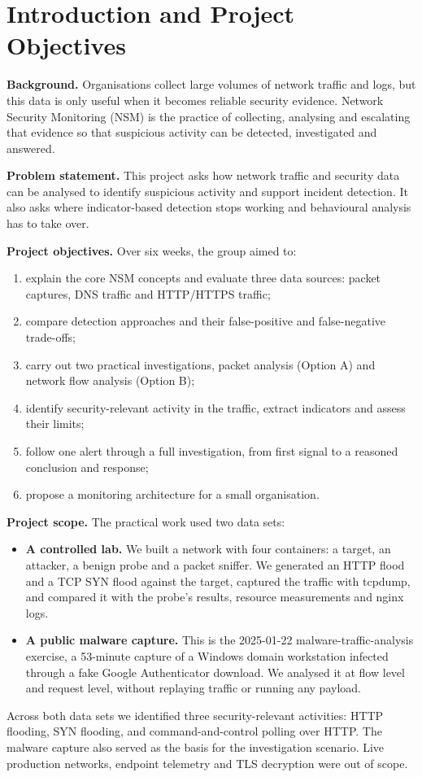 \section{Introduction and Project Objectives}
\label{sec:introduction}

\textbf{Background.}
Organisations collect large volumes of network traffic and logs, but this data is only useful when it becomes reliable security evidence. Network Security Monitoring (NSM) is the practice of collecting, analysing and escalating that evidence so that suspicious activity can be detected, investigated and answered.

\textbf{Problem statement.}
This project asks how network traffic and security data can be analysed to identify suspicious activity and support incident detection. It also asks where indicator-based detection stops working and behavioural analysis has to take over.

\textbf{Project objectives.}
Over six weeks, the group aimed to:
\begin{enumerate}
  \item explain the core NSM concepts and evaluate three data sources: packet captures, DNS traffic and HTTP/HTTPS traffic;
  \item compare detection approaches and their false-positive and false-negative trade-offs;
  \item carry out two practical investigations, packet analysis (Option A) and network flow analysis (Option B);
  \item identify security-relevant activity in the traffic, extract indicators and assess their limits;
  \item follow one alert through a full investigation, from first signal to a reasoned conclusion and response;
  \item propose a monitoring architecture for a small organisation.
\end{enumerate}

\textbf{Project scope.}
The practical work used two data sets:
\begin{itemize}
  \item \textbf{A controlled lab.} We built a network with four containers: a target, an attacker, a benign probe and a packet sniffer. We generated an HTTP flood and a TCP SYN flood against the target, captured the traffic with tcpdump, and compared it with the probe's results, resource measurements and nginx logs.
  \item \textbf{A public malware capture.} This is the 2025-01-22 malware-traffic-analysis exercise, a 53-minute capture of a Windows domain workstation infected through a fake Google Authenticator download. We analysed it at flow level and request level, without replaying traffic or running any payload.
\end{itemize}

Across both data sets we identified three security-relevant activities: HTTP flooding, SYN flooding, and command-and-control polling over HTTP. The malware capture also served as the basis for the investigation scenario. Live production networks, endpoint telemetry and TLS decryption were out of scope.
